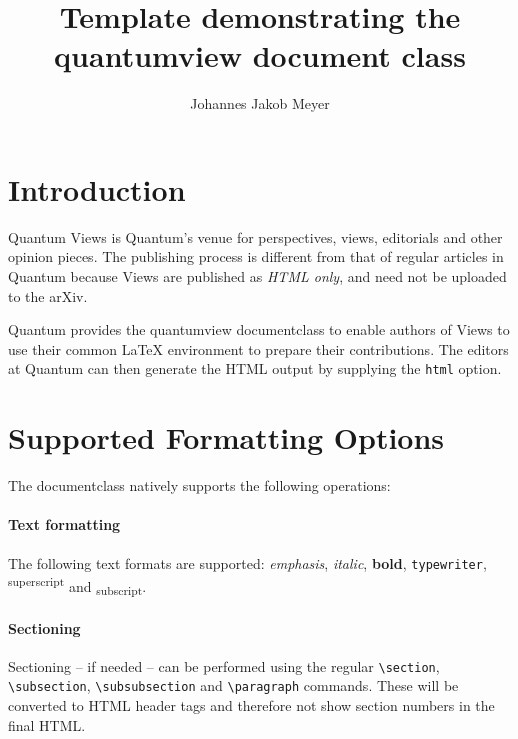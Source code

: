 \documentclass{quantumview}
\begin{document}
\title{Template demonstrating the quantumview document class}

\author{Johannes Jakob Meyer}

\maketitle

\section{Introduction}
Quantum Views is Quantum's venue for perspectives, views, editorials and other opinion pieces. The publishing process is different from that of regular articles in Quantum because Views are published as \emph{HTML only}, and need not be uploaded to the arXiv.

Quantum provides the quantumview documentclass to enable authors of Views to use their common LaTeX environment to prepare their contributions. The editors at Quantum can then generate the HTML output by supplying the \texttt{html} option.

\section{Supported Formatting Options}
The documentclass natively supports the following operations:

\paragraph{Text formatting} The following text formats are supported: \emph{emphasis}, \textit{italic}, \textbf{bold}, \texttt{typewriter}, \textsuperscript{superscript} and \textsubscript{subscript}.

\paragraph{Sectioning} Sectioning -- if needed -- can be performed using the regular \texttt{{\textbackslash}section}, \texttt{{\textbackslash}subsection}, \texttt{{\textbackslash}subsubsection} and \texttt{{\textbackslash}paragraph} commands. These will be converted to HTML header tags and therefore not show section numbers in the final HTML.
\end{document}
